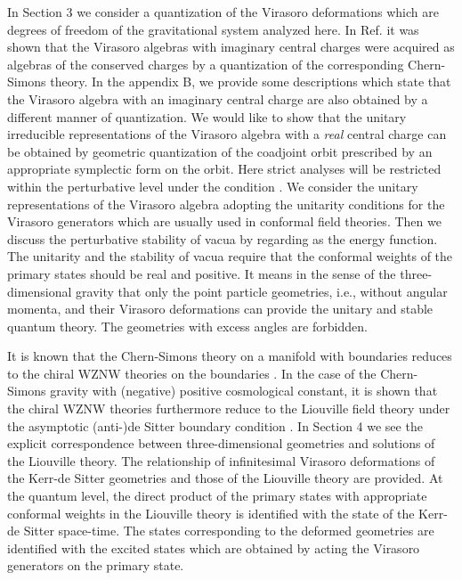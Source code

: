 \documentclass[a4paper,11pt]{article}
\begin{document}
In Section 3 we consider a quantization of the Virasoro deformations 
which are degrees of freedom of the gravitational system 
analyzed here.
In Ref.\cite{Park} it was shown that the Virasoro algebras 
with imaginary central charges were acquired as algebras 
of the conserved charges by a quantization of the corresponding 
Chern-Simons theory.
In the appendix B, we provide some descriptions which state 
that the Virasoro algebra with an imaginary central charge 
are also obtained by a different manner of quantization.
We would like to show that the unitary irreducible representations of 
the Virasoro algebra with a {\it real} central charge can be obtained 
by geometric quantization of the coadjoint orbit prescribed by 
an appropriate symplectic form on the orbit.
Here strict analyses will be restricted within the perturbative level 
under the condition \coordHE{}.
We consider the unitary representations of the Virasoro algebra 
adopting the unitarity conditions \coordHE{} for the Virasoro
generators which are usually used in conformal field theories.
Then we discuss the perturbative stability of vacua 
by regarding \coordHE{} as the energy function.
The unitarity and the stability of vacua require that 
the conformal weights of the primary states should be real and
positive. It means in the sense of the three-dimensional gravity that 
only the point particle geometries, i.e., without angular momenta, 
and their Virasoro deformations can provide the unitary and stable 
quantum theory. The geometries with excess angles are forbidden.

It is known that the Chern-Simons theory on a manifold with boundaries 
reduces to the chiral WZNW theories on the boundaries \cite{Elitzur}.
In the case of the Chern-Simons gravity with (negative) positive 
cosmological constant, it is shown that the chiral WZNW theories 
furthermore reduce to the Liouville field theory under the asymptotic 
(anti-)de Sitter boundary condition \cite{CHD-BO, Klemm1}.
In Section 4 we see the explicit correspondence between 
three-dimensional geometries and solutions of the Liouville theory. 
The relationship of infinitesimal Virasoro deformations of 
the Kerr-de Sitter geometries and those of the Liouville theory 
are provided.
At the quantum level, the direct product of the primary states 
with appropriate conformal weights in the Liouville theory 
is identified with the state of the Kerr-de Sitter space-time.
The states corresponding to the deformed geometries are identified 
with the excited states which are obtained by acting the Virasoro
generators on the primary state.
\end{document}
